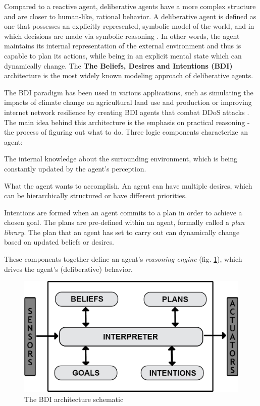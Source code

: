 \documentclass[0main.tex]{subfiles}
\begin{document}
Compared to a reactive agent, deliberative agents have a more complex structure and are closer to 
human-like, rational behavior. A deliberative agent is defined as one that
possesses an explicitly represented, symbolic model of the world, and in which
decisions are made via symbolic reasoning \cite{Wooldridge1996}. In other words,
the agent maintains its internal representation of the external environment and
thus is capable to plan its actions, while being in an explicit mental state which
can dynamically change. The \textbf{The Beliefs, Desires and Intentions (BDI)} architecture
is the most widely known modeling approach of deliberative agents.

The BDI paradigm has been used in various applications, such as simulating the impacts of climate
change on agricultural land use and production \cite{Caillou2017} or improving internet
network resilience by creating BDI agents that combat DDoS attacks \cite{Nunes2017}. The main
idea behind this architecture is the emphasis on practical reasoning - the process of figuring
out what to do. Three logic components characterize an agent:

The internal knowledge about the surrounding environment, which
is being constantly updated by the agent's perception.

What the agent wants to accomplish. An agent can have multiple desires, which can be
hierarchically structured or have different priorities.

Intentions are formed when an agent commits to a plan in order to achieve a chosen goal.
The plans are pre-defined within an agent, formally called a \emph{plan library}.
The plan that an agent has set to carry out can dynamically change based on updated beliefs or
desires.

These components together define an agent's \emph{reasoning engine} (fig. \ref{bdi-schematic}),
which drives the agent's (deliberative) behavior. 

\begin{figure}[htbp]
    \centering
    \includegraphics[width = .8\textwidth]{bdi-infographic-unified.png}
    \caption{The BDI architecture schematic}
    \label{bdi-schematic}
\end{figure}
\end{document}
